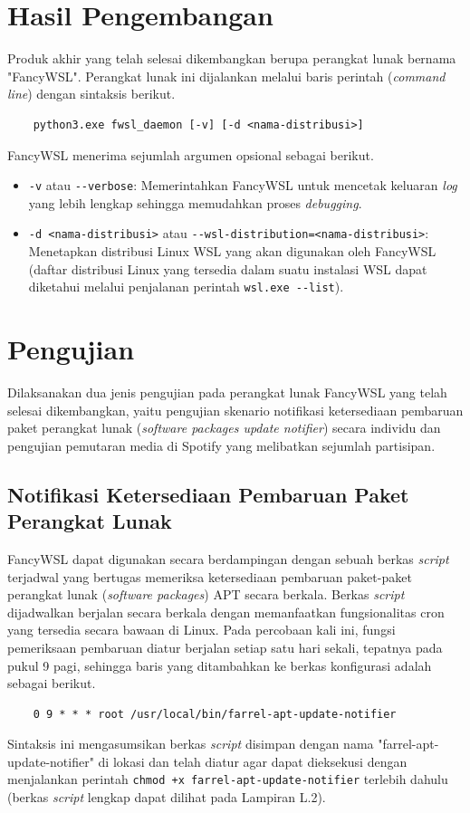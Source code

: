 \section{Hasil Pengembangan}

Produk akhir yang telah selesai dikembangkan berupa perangkat lunak bernama "FancyWSL". Perangkat lunak ini dijalankan melalui baris perintah (\textit{command line}) dengan sintaksis berikut.

\begin{lstlisting}
    python3.exe fwsl_daemon [-v] [-d <nama-distribusi>]
\end{lstlisting}

FancyWSL menerima sejumlah argumen opsional sebagai berikut.
\begin{itemize}
    \item \verb|-v| atau \verb|--verbose|: Memerintahkan FancyWSL untuk mencetak keluaran \textit{log} yang lebih lengkap sehingga memudahkan proses \textit{debugging}.
    \item \verb|-d <nama-distribusi>| atau \verb|--wsl-distribution=<nama-distribusi>|: Menetapkan distribusi Linux WSL yang akan digunakan oleh FancyWSL (daftar distribusi Linux yang tersedia dalam suatu instalasi WSL dapat diketahui melalui penjalanan perintah \lstinline{wsl.exe --list}).
\end{itemize}

\section{Pengujian}

Dilaksanakan dua jenis pengujian pada perangkat lunak FancyWSL yang telah selesai dikembangkan, yaitu pengujian skenario notifikasi ketersediaan pembaruan paket perangkat lunak (\textit{software packages update notifier}) secara individu dan pengujian pemutaran media di Spotify yang melibatkan sejumlah partisipan.

\subsection{Notifikasi Ketersediaan Pembaruan Paket Perangkat Lunak}

FancyWSL dapat digunakan secara berdampingan dengan sebuah berkas \textit{script} terjadwal yang bertugas memeriksa ketersediaan pembaruan paket-paket perangkat lunak (\textit{software packages}) APT secara berkala. Berkas \textit{script} dijadwalkan berjalan secara berkala dengan memanfaatkan fungsionalitas cron yang tersedia secara bawaan di Linux. Pada percobaan kali ini, fungsi pemeriksaan pembaruan diatur berjalan setiap satu hari sekali, tepatnya pada pukul 9 pagi, sehingga baris yang ditambahkan ke berkas konfigurasi  adalah sebagai berikut.
\begin{lstlisting}
    0 9 * * * root /usr/local/bin/farrel-apt-update-notifier
\end{lstlisting}
Sintaksis ini mengasumsikan berkas \textit{script} disimpan dengan nama "farrel-apt-update-notifier" di lokasi  dan telah diatur agar dapat dieksekusi dengan menjalankan perintah \lstinline{chmod +x farrel-apt-update-notifier} terlebih dahulu (berkas \textit{script} lengkap dapat dilihat pada Lampiran L.2).

